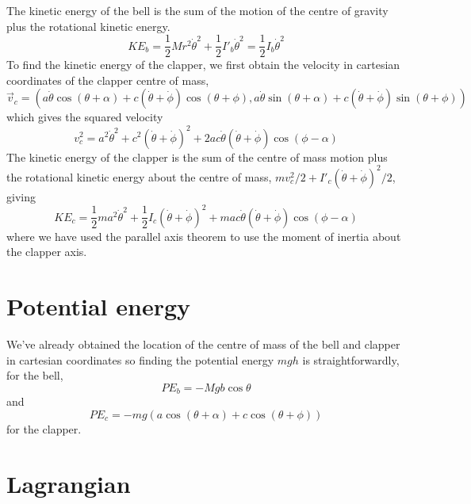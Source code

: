 \documentclass{article}
\begin{document}
The kinetic energy of the bell is the sum of the motion of the centre of gravity plus the rotational
kinetic energy.
\begin{equation}
{KE}_{b} = \frac{1}{2}M r^2 \dot{\theta}^2 + \frac{1}{2}I'_b \dot{\theta}^2 
= \frac{1}{2}I_b \dot{\theta}^2
\end{equation}
To find the kinetic energy of the clapper, we first obtain the velocity in cartesian coordinates
of the clapper centre of mass,
\begin{equation}
\vec{v}_c = (a \dot{\theta} \cos(\theta + \alpha) + c (\dot{\theta} + \dot{\phi}) \cos(\theta+\phi),
a \dot{\theta} \sin(\theta+\alpha) + c (\dot{\theta}+\dot{\phi}) \sin(\theta+\phi))
\end{equation}
which gives the squared velocity
\begin{equation}
v_c^2 = a^2 \dot{\theta}^2 + c^2 (\dot{\theta} + \dot{\phi})^2 
+ 2ac \dot{\theta}(\dot{\theta}+\dot{\phi}) \cos(\phi - \alpha)
\end{equation}
The kinetic energy of the clapper is the sum of the centre of mass motion plus the rotational
kinetic energy about the centre of mass, $m v_c^2/2 + I'_c(\dot{\theta}+\dot{\phi})^2/2$, giving
\begin{equation}
{KE}_{c} = \frac{1}{2}m a^2 \dot{\theta}^2 + \frac{1}{2}I_c (\dot{\theta}+\dot{\phi})^2
+ mac \dot{\theta} (\dot{\theta} + \dot{\phi}) \cos(\phi - \alpha)
\end{equation}
where we have used the parallel axis theorem to use the moment of inertia about the clapper axis.

\section{Potential energy}

We've already obtained the location of the centre of mass of the bell and clapper in cartesian
coordinates so finding the potential energy $mgh$ is straightforwardly, for the bell,
\begin{equation}
{PE}_b = -Mgb \cos \theta
\end{equation}
and
\begin{equation}
{PE}_c = -mg \left(a \cos(\theta+\alpha) + c \cos(\theta + \phi) \right)
\end{equation}
for the clapper.

\section{Lagrangian}
\end{document}
